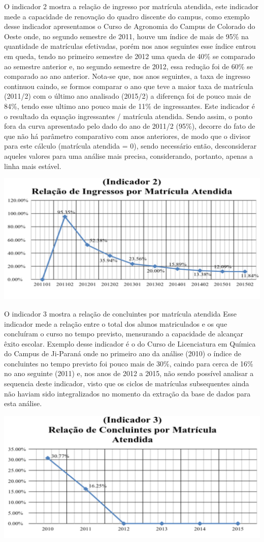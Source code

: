 \documentclass[article,12pt,onesidea,4paper,english,brazil]{abntex2}
\begin{document}
	O indicador 2 mostra a relação de ingresso por matrícula atendida, este indicador mede a
	capacidade de renovação do quadro discente do campus, como exemplo desse indicador
	apresentamos o Curso de Agronomia do Campus de Colorado do Oeste onde, no segundo
	semestre de 2011, houve um índice de mais de 95\% na quantidade de matrículas efetivadas,
	porém nos anos seguintes esse índice entrou em queda, tendo no primeiro semestre de 2012 uma
	queda de 40\% se comparado ao semestre anterior e, no segundo semestre de 2012, essa redução
	foi de 60\% se comparado ao ano anterior. Nota-se que, nos anos seguintes, a taxa de ingresso
	continuou caindo, se formos comparar o ano que teve a maior taxa de matrícula (2011/2) com o
	último ano analisado (2015/2) a diferença foi de pouco mais de 84\%, tendo esse ultimo ano pouco
	mais de 11\% de ingressantes.
	Este indicador é o resultado da equação ingressantes / matrícula atendida. Sendo assim, o ponto
	fora da curva apresentado pelo dado do ano de 2011/2 (95\%), decorre do fato de que não há
	parâmetro comparativo com anos anteriores, de modo que o divisor para este cálculo (matrícula
	atendida = 0), sendo necessário então, desconsiderar aqueles valores para uma análise mais
	precisa, considerando, portanto, apenas a linha mais estável.
	\begin{center}
		\includegraphics[width=0.7\linewidth]{PIP-97-2}
	\end{center}
	
	O indicador 3 mostra a relação de concluintes por matrícula atendida Esse indicador mede
	a relação entre o total dos alunos matriculados e os que concluíram o curso no tempo previsto,
	mensurando a capacidade de alcançar êxito escolar. Exemplo desse indicador é o do Curso de
	Licenciatura em Química do Campus de Ji-Paraná onde no primeiro ano da análise (2010) o índice de concluintes no tempo previsto foi pouco mais de 30\%, caindo para cerca de 16\% no ano
	seguinte (2011) e, nos anos de 2012 a 2015, não sendo possível analisar a sequencia deste
	indicador, visto que os ciclos de matrículas subsequentes ainda não haviam sido integralizados no
	momento da extração da base de dados para esta análise.
	\begin{center}
		\includegraphics[width=0.7\linewidth]{PIP-97-3}
	\end{center}
	
\end{document}

